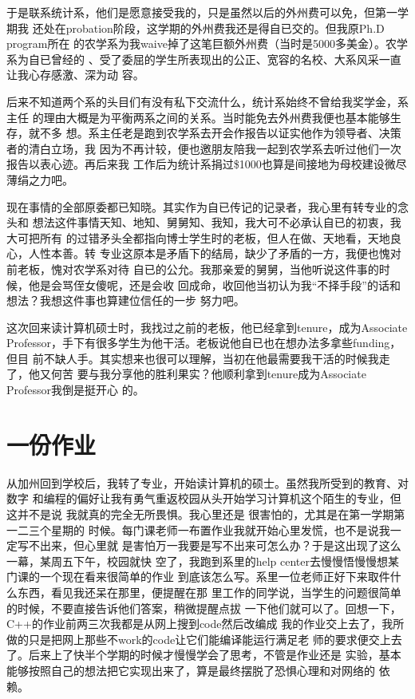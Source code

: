 \documentclass[12pt]{book}
\begin{document}
于是联系统计系，他们是愿意接受我的，只是虽然以后的外州费可以免，但第一学期我
还处在probation阶段，这学期的外州费我还是得自已交的。但我原Ph.D program所在
的农学系为我waive掉了这笔巨额外州费（当时是5000多美金）。农学系为自已曾经的
、受了委屈的学生所表现出的公正、宽容的名校、大系风采一直让我心存感激、深为动
容。

后来不知道两个系的头目们有没有私下交流什么，统计系始终不曾给我奖学金，系主任
的理由大概是为平衡两系之间的关系。当时能免去外州费我便也基本能够生存，就不多
想。系主任老是跑到农学系去开会作报告以证实他作为领导者、决策者的清白立场，我
因为不再计较，便也邀朋友陪我一起到农学系去听过他们一次报告以表心迹。再后来我
工作后为统计系捐过\$1000也算是间接地为母校建设微尽薄绢之力吧。

现在事情的全部原委都已知晓。其实作为自已传记的记录者，我心里有转专业的念头和
想法这件事情天知、地知、舅舅知、我知，我大可不必承认自已的初衷，我大可把所有
的过错矛头全都指向博士学生时的老板，但人在做、天地看，天地良心，人性本善。转
专业这原本是矛盾下的结局，缺少了矛盾的一方，我便也愧对前老板，愧对农学系对待
自已的公允。我那亲爱的舅舅，当他听说这件事的时候，他是会骂侄女傻呢，还是会收
回成命，收回他当初认为我“不择手段”的话和想法？我想这件事也算建位信任的一步
努力吧。

这次回来读计算机硕士时，我找过之前的老板，他已经拿到tenure，成为Associate 
Professor，手下有很多学生为他干活。老板说他自已也在想办法多拿些funding，但目
前不缺人手。其实想来也很可以理解，当初在他最需要我干活的时候我走了，他又何苦
要与我分享他的胜利果实？他顺利拿到tenure成为Associate Professor我倒是挺开心
的。
\section{一份作业}
\label{sec-12-9}

从加州回到学校后，我转了专业，开始读计算机的硕士。虽然我所受到的教育、对数字
和编程的偏好让我有勇气重返校园从头开始学习计算机这个陌生的专业，但这并不是说
我就真的完全无所畏惧。我心里还是 很害怕的，尤其是在第一学期第一二三个星期的
时候。每门课老师一布置作业我就开始心里发慌，也不是说我一定写不出来，但心里就
是害怕万一我要是写不出来可怎么办？于是这出现了这么一幕，某周五下午，校园就快
空了，我跑到系里的help center去慢慢悟慢慢想某门课的一个现在看来很简单的作业
到底该怎么写。系里一位老师正好下来取件什么东西，看见我还呆在那里，便提醒在那
里工作的同学说，当学生的问题很简单的时候，不要直接告诉他们答案，稍微提醒点拔
一下他们就可以了。回想一下，C++的作业前两三次我都是从网上搜到code然后改编成
我的作业交上去了，我所做的只是把网上那些不work的code让它们能编译能运行满足老
师的要求便交上去了。后来上了快半个学期的时候才慢慢学会了思考，不管是作业还是
实验，基本能够按照自己的想法把它实现出来了，算是最终摆脱了恐惧心理和对网络的
依赖。
\end{document}
